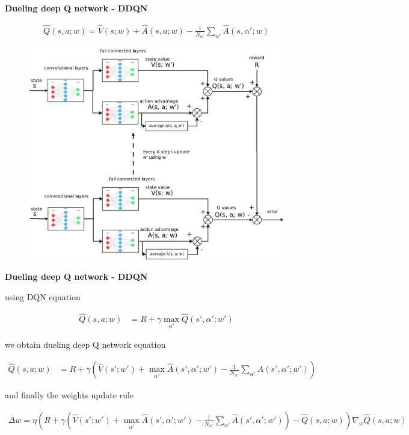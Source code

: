 \documentclass[xcolor=dvipsnames]{beamer}
\begin{document}
\begin{frame}{\bf Dueling deep Q network - DDQN}

\begin{align*}
  \hat{Q}(s, a; w) = \hat{V}(s; w) + \hat{A}(s, a; w) - \frac{1}{N_{\alpha'}} \sum_{\alpha'} \hat{A}(s, \alpha'; w)
\end{align*}

\begin{figure}[!htb]
  \centering
  \includegraphics[scale=0.18]{../../diagrams/dueling_dqn_1.png}
  \label{img:ddqn_full}
\end{figure}

\end{frame}


\begin{frame}{\bf Dueling deep Q network - DDQN}

using DQN equation

{\footnotesize
\begin{align*}
  \hat{Q}(s, a; w) &= R + \gamma \max \limits_{\alpha'} \hat{Q}(s', \alpha'; w')
\end{align*}
}

we obtain dueling deep Q network equation

{\footnotesize
\begin{align*}
  \hat{Q}(s, a; w)&= R + \gamma \left( \hat{V}(s'; w') + \max \limits_{\alpha'} \hat{A}(s', \alpha'; w') - \frac{1}{N_{\alpha'}} \sum_{\alpha'} \hat{A}(s', \alpha'; w') \right)
\end{align*}
}

and finally the weights update rule

{\tiny

\begin{align*}
  \Delta w = \eta \left( R + \gamma \left( \hat{V}(s'; w') + \max \limits_{\alpha'} \hat{A}(s', \alpha'; w') - \frac{1}{N_{\alpha'}} \sum_{\alpha'} \hat{A}(s', \alpha'; w') \right) - \hat{Q}(s, a; w)\right) \nabla_w \hat{Q}(s, a; w)
\end{align*}
}
\end{frame}
\end{document}
